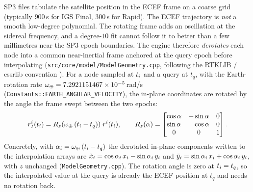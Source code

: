 \documentclass[main.tex]{subfiles}
\begin{document}
SP3 files tabulate the satellite position in the ECEF frame on a coarse
grid (typically $900$\,s for IGS Final, $300$\,s for Rapid).  The ECEF
trajectory is \emph{not} a smooth low-degree polynomial.  The rotating
frame adds an oscillation at the sidereal frequency, and a degree-$10$
fit cannot follow it to better than a few millimetres near the SP3 epoch
boundaries.  The engine therefore \emph{derotates} each node into a
common near-inertial frame anchored at the query epoch before
interpolating
(\texttt{src/core/model/ModelGeometry.cpp}, following the
RTKLIB / cssrlib convention \cite{takasu2009rtklib}).  For a node sampled
at $t_{i}$ and a query at $t_q$, with the Earth-rotation rate
$\omega_{\oplus} = 7.2921151467\times10^{-5}$\,rad/s
(\texttt{Constants::EARTH\_ANGULAR\_VELOCITY}), the in-plane coordinates
are rotated by the angle the frame swept between the two epochs:
\begin{equation}
r^{i}_{I}(t_{i})
=
R_z(\omega_{\oplus}\,(t_{i}-t_q))\;r^{i}(t_{i}),
\qquad
R_z(\alpha)=
\begin{bmatrix}
\cos\alpha & -\sin\alpha & 0\\
\sin\alpha & \phantom{-}\cos\alpha & 0\\
0 & 0 & 1
\end{bmatrix}.
\label{eq:prod-derotate}
\end{equation}
Concretely, with $\alpha_{i}=\omega_{\oplus}\,(t_{i}-t_q)$ the derotated
in-plane components written to the interpolation arrays are
$\tilde{x}_{i}=\cos\alpha_{i}\,x_{i}-\sin\alpha_{i}\,y_{i}$
and
$\tilde{y}_{i}=\sin\alpha_{i}\,x_{i}+\cos\alpha_{i}\,y_{i}$,
with $z$ unchanged (\texttt{ModelGeometry.cpp}).  The rotation angle is
zero at $t_{i}=t_q$, so the interpolated value at the query is
already the ECEF position at $t_q$ and needs no rotation back.
\end{document}
